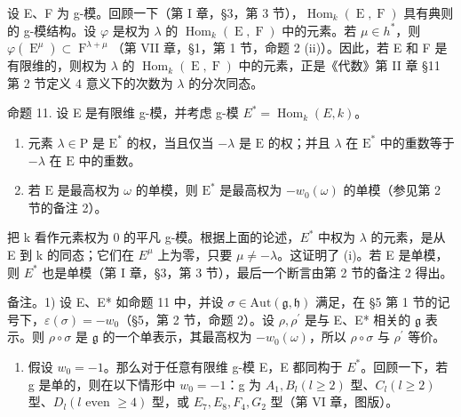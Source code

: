 设 E、F 为 g-模。回顾一下（第 I 章，§3，第 3 节），\(\operatorname{Hom}_{k}(\operatorname{E},\operatorname{F})\) 具有典则的 g-模结构。设 \(\varphi\) 是权为 \(\lambda\) 的 \(\operatorname{Hom}_{k}(\operatorname{E},\operatorname{F})\) 中的元素。若 \(\mu \in h^{*}\)，则 \(\varphi(\operatorname{E}^{\mu}) \subset \operatorname{F}^{\lambda + \mu}\)（第 VII 章，§1，第 1 节，命题 2 (ii)）。因此，若 E 和 F 是有限维的，则权为 \(\lambda\) 的 \(\operatorname{Hom}_{k}(\operatorname{E},\operatorname{F})\) 中的元素，正是《代数》第 II 章 §11 第 2 节定义 4 意义下的次数为 \(\lambda\) 的分次同态。

命题 11. 设 E 是有限维 g-模，并考虑 g-模 \(E^{*} = \operatorname{Hom}_{k}(E, k)\)。

\begin{enumerate}
\def\labelenumi{(\roman{enumi})}
\item
  元素 \(\lambda \in \mathrm{P}\) 是 \(\mathrm{E}^*\) 的权，当且仅当 \(-\lambda\) 是 \(\mathrm{E}\) 的权；并且 \(\lambda\) 在 \(\mathrm{E}^*\) 中的重数等于 \(-\lambda\) 在 \(\mathrm{E}\) 中的重数。
\item
  若 \(\mathrm{E}\) 是最高权为 \(\omega\) 的单模，则 \(\mathrm{E}^*\) 是最高权为 \(-w_0(\omega)\) 的单模（参见第 2 节的备注 2）。
\end{enumerate}

把 k 看作元素权为 0 的平凡 g-模。根据上面的论述，\(E^{*}\) 中权为 \(\lambda\) 的元素，是从 E 到 k 的同态；它们在 \(E^{\mu}\) 上为零，只要 \(\mu \neq -\lambda\)。这证明了 (i)。若 E 是单模，则 \(E^{*}\) 也是单模（第 I 章，§3，第 3 节），最后一个断言由第 2 节的备注 2 得出。

备注。1) 设 E、E* 如命题 11 中，并设 \(\sigma \in \mathrm{Aut}(\mathfrak{g},\mathfrak{h})\) 满足，在 §5 第 1 节的记号下，\(\varepsilon (\sigma) = -w_0\)（§5，第 2 节，命题 2）。设 \(\rho ,\rho^{\prime}\) 是与 E、E* 相关的 \(\mathfrak{g}\) 表示。则 \(\rho \circ \sigma\) 是 \(\mathfrak{g}\) 的一个单表示，其最高权为 \(-w_{0}(\omega)\)，所以 \(\rho \circ \sigma\) 与 \(\rho^{\prime}\) 等价。

\begin{enumerate}
\def\labelenumi{\arabic{enumi})}
\setcounter{enumi}{1}
\tightlist
\item
  假设 \(w_{0} = -1\)。那么对于任意有限维 g-模 E，E 都同构于 \(E^{*}\)。回顾一下，若 g 是单的，则在以下情形中 \(w_{0} = -1\)：g 为 \(A_{1}, B_{l} (l \geq 2)\) 型、\(C_{l} (l \geq 2)\) 型、\(D_{l} (l \text{ even } \geq 4)\) 型，或 \(E_{7}, E_{8}, F_{4}, G_{2}\) 型（第 VI 章，图版）。
\end{enumerate}

